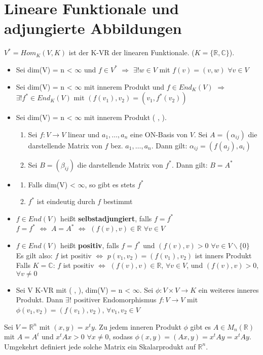 \section{Lineare Funktionale und adjungierte Abbildungen}
$V^* = Hom_K(V,K)$ ist der K-VR der linearen Funktionale. ($K = \{\mathbb{R}, \mathbb{C}\}$).
\begin{itemize}
\item Sei dim(V) = n < $\infty$ und $f \in V^*$ $\Rightarrow$ $\exists ! w \in V$ mit $f(v) = (v,w)$ $\forall v \in V$
\item Sei dim(V) = n < $\infty$ mit innerem Produkt und $ f \in End_K(V)$ $\Rightarrow$ $\exists ! f^* \in End_K(V)$ mit $(f(v_1), v_2) = (v_1, f^*(v_2))$
\item Sei dim(V) = n < $\infty$ mit innerem Produkt ( , ).
\begin{enumerate}
\item Sei $f: V \to V$ linear und $a_1, …, a_n$ eine ON-Basis von $V$. Sei $A = (\alpha_{ij})$ die darstellende Matrix von $f$ bez. $a_1, …, a_n$. Dann gilt: $\alpha_{ij} = (f(a_j), a_i)$
\item Sei $B = (\beta_{ij})$ die darstellende Matrix von $f^*$. Dann gilt: $B = A^*$
\end{enumerate}
\item
\begin{remark}
\begin{enumerate}
\item Falls dim(V) < $\infty$, so gibt es stets $f^*$
\item $f^*$ ist eindeutig durch $f$ bestimmt
\end{enumerate}
\end{remark}
\item $f \in End(V)$ heißt \textbf{selbstadjungiert}, falls $f = f^*$\\
$f = f^*$ $\Leftrightarrow$ $A = A^*$ $\Leftrightarrow$ $(f(v), v) \in \mathbb{R}$ $\forall v \in V$
\item $f \in End(V)$ heißt \textbf{positiv}, falls $f= f^*$ und $(f(v), v) > 0$ $\forall v \in V \backslash \{0\}$\\
Es gilt also: $f$ ist positiv $\Leftrightarrow$ $p(v_1, v_2) = (f(v_1), v_2)$ ist inners Produkt\\
Falls $K = \mathbb{C}$: $f$ ist positiv $\Leftrightarrow$ $(f(v), v) \in \mathbb{R}$, $\forall v \in V$, und $(f(v), v) > 0$, $\forall v \neq 0$
\item Sei V K-VR mit ( , ), dim(V) = n < $\infty$. Sei $\phi: V \times V \to K$ ein weiteres inneres Produkt. Dann $\exists !$ positiver Endomorphismus $f: V \to V$ mit $\phi(v_1, v_2) = (f(v_1), v_2)$, $\forall v_1, v_2 \in V$
\end{itemize}
\begin{remark}
Sei $V = \mathbb{R}^n$ mit $(x, y) = x^ty$. Zu jedem inneren Produkt $\phi$ gibt es $A \in M_n(\mathbb{R})$ mit $A = A^t$ und $x^tAx > 0$ $\forall x \neq 0$, sodass $\phi (x, y) = (Ax, y) = x^tAy = x^tAy$.\\
Umgekehrt definiert jede solche Matrix ein Skalarprodukt auf $\mathbb{R}^n$.
\end{remark}

